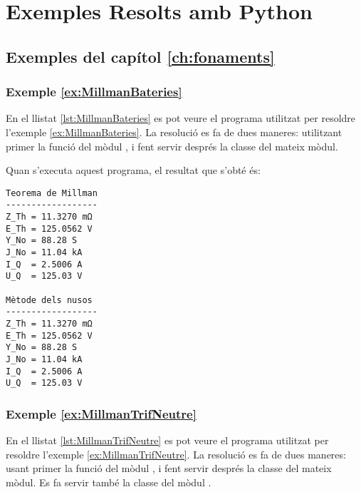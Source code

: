 \chapter{Exemples Resolts amb Python}\label{chap:python-exemples}


\section{Exemples del capítol \ref*{ch:fonaments}}

\hypertarget{exemple:MillmanBateries}{\subsection{Exemple \ref*{ex:MillmanBateries} \MillmanBateries}}

En el llistat \vref{lst:MillmanBateries} es pot veure el programa utilitzat per resoldre l'exemple \vref{ex:MillmanBateries}. La resolució es fa de dues maneres: utilitzant primer la funció  del mòdul , i fent servir després la classe   del mateix mòdul.


Quan s'executa aquest programa, el resultat que s'obté és:
\lstset{
	language=,
	numbers=none,
	frame=none
}
\begin{lstlisting}
Teorema de Millman
------------------
Z_Th = 11.3270 mΩ
E_Th = 125.0562 V
Y_No = 88.28 S
J_No = 11.04 kA
I_Q  = 2.5006 A
U_Q  = 125.03 V

Mètode dels nusos
------------------
Z_Th = 11.3270 mΩ
E_Th = 125.0562 V
Y_No = 88.28 S
J_No = 11.04 kA
I_Q  = 2.5006 A
U_Q  = 125.03 V
\end{lstlisting} 


\hypertarget{exemple:MillmanTrifNeutre}{\subsection{Exemple \ref*{ex:MillmanTrifNeutre} \MillmanTrifNeutre}}

En el llistat \vref{lst:MillmanTrifNeutre} es pot veure el programa utilitzat per resoldre l'exemple \vref{ex:MillmanTrifNeutre}. La resolució es fa de dues maneres: usant primer la funció  del mòdul , i fent servir després la classe   del mateix mòdul. Es fa servir també la classe  del mòdul .


